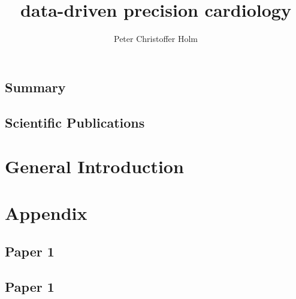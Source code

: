 \documentclass[%
    a4paper, twoside, nobib%
]{tufte-book}
\title{data-driven precision cardiology}
\author[Peter Christoffer Holm]{Peter Christoffer Holm}
\begin{document}
\frontmatter
\maketitle




\cleardoublepage

\listoftodos
 
\tableofcontents
\listoffigures
\listoftables
\cleardoublepage


\mainmatter

\chapter{Summary}
\chapter{Scientific Publications}


\part{General Introduction}






\backmatter

\printbibliography


\part*{Appendix}

\appendix

\chapter{Paper 1}
\chapter{Paper 1}


\end{document}
